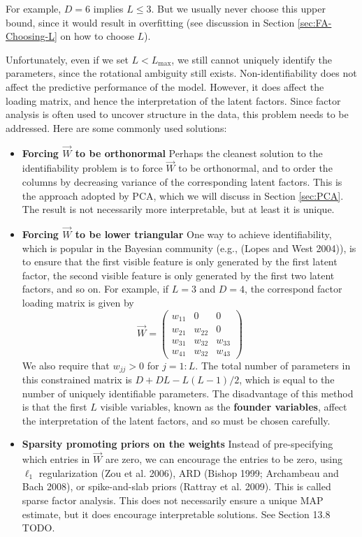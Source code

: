 For example, $D=6$ implies $L \leq 3$. But we usually never choose this upper bound, since it would result in overfitting (see discussion in Section \ref{sec:FA-Choosing-L} on how to choose $L$).


Unfortunately, even if we set $L < L_{\mathrm{max}}$, we still cannot uniquely identify the parameters, since the rotational ambiguity still exists. Non-identifiability does not affect the predictive performance of the model. However, it does affect the loading matrix, and hence the interpretation of the latent factors. Since factor analysis is often used to uncover structure in the data, this problem needs to be addressed. Here are some commonly used solutions:
\begin{itemize}
\item{\textbf{Forcing $\vec{W}$ to be orthonormal} Perhaps the cleanest solution to the identifiability problem is to force $\vec{W}$ to be orthonormal, and to order the columns by decreasing variance of the corresponding latent factors. This is the approach adopted by PCA, which we will discuss in Section \ref{sec:PCA}. The result is not necessarily more interpretable, but at least it is unique.}
\item{\textbf{Forcing $\vec{W}$ to be lower triangular} One way to achieve identifiability, which is popular in the Bayesian community (e.g., (Lopes and West 2004)), is to ensure that the first visible feature is only generated by the first latent factor, the second visible feature is only generated by the first two latent factors, and so on. For example, if $L=3$ and $D=4$, the correspond factor loading matrix is given by
\begin{equation*}
\vec{W}=\left(\begin{array}{ccc}
w_{11} & 0 & 0 \\
w_{21} & w_{22} & 0 \\
w_{31} & w_{32} & w_{33} \\
w_{41} & w_{32} & w_{43}
\end{array}\right)
\end{equation*}
We also require that $w_{jj} >0$ for $j =1:L$. The total number of parameters in this constrained matrix is $D+DL-L(L-1)/2$, which is equal to the number of uniquely identifiable parameters. The disadvantage of this method is that the first $L$ visible variables, known as the \textbf{founder variables}, affect the interpretation of the latent factors, and so must be chosen carefully.}
\item{\textbf{Sparsity promoting priors on the weights} Instead of pre-specifying which entries in $\vec{W}$ are zero, we can encourage the entries to be zero, using $\ell_1$ regularization (Zou et al. 2006), ARD (Bishop 1999; Archambeau and Bach 2008), or spike-and-slab priors (Rattray et al. 2009). This is called sparse factor analysis. This does not necessarily ensure a unique MAP estimate, but it does encourage interpretable solutions. See Section 13.8 TODO.}

\end{itemize}
